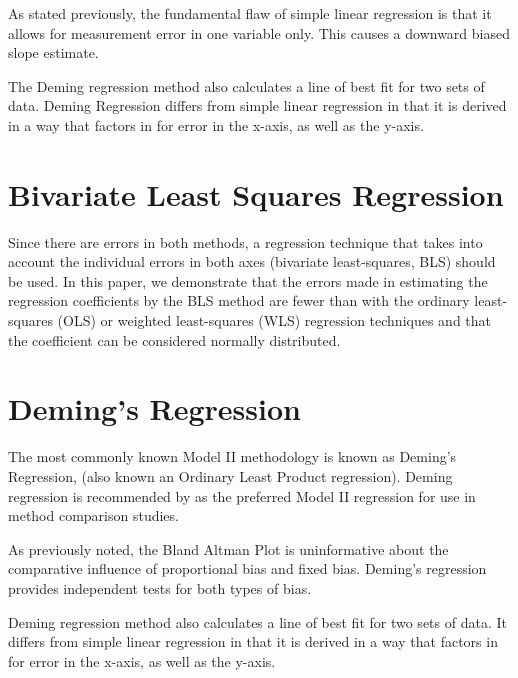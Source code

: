 \documentclass[12pt, a4paper]{report}
\theoremstyle{plain}
\theoremstyle{definition}
\theoremstyle{remark}
\begin{document}
As stated previously, the fundamental flaw of simple linear regression is that it allows for measurement error in one variable only. This causes a downward biased slope estimate.


The Deming regression method also calculates a line of best fit for two sets of data. Deming Regression differs from simple linear regression in that it is derived in a way that factors in for error in the x-axis, as well as the y-axis.


\section{Bivariate Least Squares Regression} Since there
are errors in both methods, a regression technique that takes into account the individual errors in both axes (bivariate least-squares, BLS) should be used. In this paper, we demonstrate that the errors made in estimating the regression coefficients by the BLS method are fewer than with the ordinary least-squares (OLS) or weighted least-squares (WLS) regression techniques and that the coefficient can be considered normally distributed.


\section{Deming's Regression}
The most commonly known Model II methodology is known as Deming's Regression, (also known an Ordinary Least Product regression). Deming regression is recommended by \citet*{CornCoch} as the preferred Model II regression for use in method comparison studies. 

As previously noted, the Bland Altman Plot is
uninformative about the comparative influence of proportional bias and fixed bias. Deming's regression provides independent tests for both types of bias.


Deming regression method also calculates a line of best fit for two sets of data. It differs from simple linear regression in that it is derived in a way that factors in for error in the x-axis, as well as the y-axis.
\end{document}
